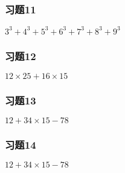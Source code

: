\begin{frame}
    \frametitle{习题11}
    \centering\textit{\Large $3^3 + 4^3 + 5^3 + 6^3 + 7^3 + 8^3 + 9^3$}
\end{frame}

\begin{frame}
    \frametitle{习题12}
    \centering\textit{\Large $12\times 25 + 16\times 15$}
\end{frame}

\begin{frame}
    \frametitle{习题13}
    \centering\textit{\Large $12 + 34\times 15 -78$}
\end{frame}

\begin{frame}
    \frametitle{习题14}
    \centering\textit{\Large $12 + 34\times 15 -78$}
\end{frame}